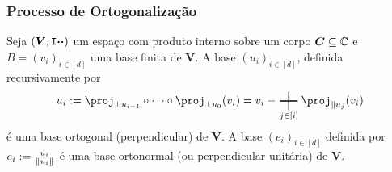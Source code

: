 \subsubsection{Processo de Ortogonalização}

Seja $(\bm V,\mathtt I{\bm{\cdot}}{\bm{\cdot}})$ um espaço com produto interno sobre um corpo $\bm C \subseteq \mathbb{C}$ e $B = (v_i)_{i \in [d]}$ uma base finita de $\bm V$. A base $(u_i)_{i \in [d]}$, definida recursivamente por
	\begin{equation*}
	u_i := \proj_{\perp u_{i-1}} \circ \cdots \circ \proj_{\perp u_0} (v_i) =  v_i - \sum_{j \in [i]} \proj_{\parallel u_j} (v_i)
	\end{equation*}
é uma base ortogonal (perpendicular) de $\bm V$. A base $(e_i)_{i \in [d]}$ definida por $e_i := \frac{u_i}{\left\Vert{u_i}\right\Vert}$ é uma base ortonormal (ou perpendicular unitária) de $\bm V$.


